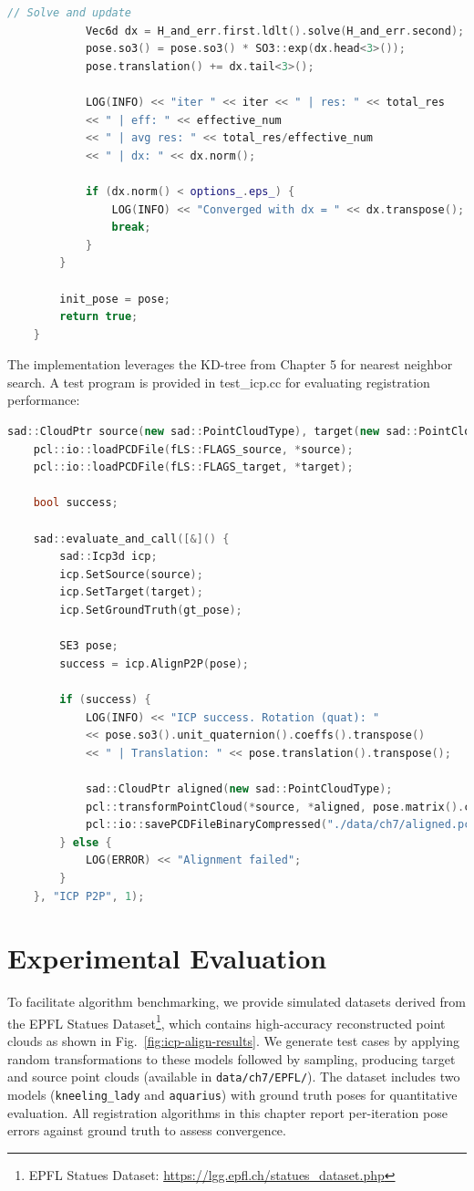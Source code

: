 \begin{lstlisting}[language=c++,caption=ch7/icp\_3d.cc]
			// Solve and update
			Vec6d dx = H_and_err.first.ldlt().solve(H_and_err.second);
			pose.so3() = pose.so3() * SO3::exp(dx.head<3>());
			pose.translation() += dx.tail<3>();
			
			LOG(INFO) << "iter " << iter << " | res: " << total_res 
			<< " | eff: " << effective_num
			<< " | avg res: " << total_res/effective_num
			<< " | dx: " << dx.norm();
			
			if (dx.norm() < options_.eps_) {
				LOG(INFO) << "Converged with dx = " << dx.transpose();
				break;
			}
		}
		
		init_pose = pose;
		return true;
	}
\end{lstlisting}

The implementation leverages the KD-tree from Chapter 5 for nearest neighbor search. A test program is provided in test\_icp.cc for evaluating registration performance:

\begin{lstlisting}[language=c++,caption=src/ch7/test/test_icp.cc]
	sad::CloudPtr source(new sad::PointCloudType), target(new sad::PointCloudType);
	pcl::io::loadPCDFile(fLS::FLAGS_source, *source);
	pcl::io::loadPCDFile(fLS::FLAGS_target, *target);
	
	bool success;
	
	sad::evaluate_and_call([&]() {
		sad::Icp3d icp;
		icp.SetSource(source);
		icp.SetTarget(target);
		icp.SetGroundTruth(gt_pose);
		
		SE3 pose;
		success = icp.AlignP2P(pose);
		
		if (success) {
			LOG(INFO) << "ICP success. Rotation (quat): " 
			<< pose.so3().unit_quaternion().coeffs().transpose()
			<< " | Translation: " << pose.translation().transpose();
			
			sad::CloudPtr aligned(new sad::PointCloudType);
			pcl::transformPointCloud(*source, *aligned, pose.matrix().cast<float>());
			pcl::io::savePCDFileBinaryCompressed("./data/ch7/aligned.pcd", *aligned);
		} else {
			LOG(ERROR) << "Alignment failed";
		}
	}, "ICP P2P", 1);
\end{lstlisting}

\section{Experimental Evaluation}
To facilitate algorithm benchmarking, we provide simulated datasets derived from the EPFL Statues Dataset\footnote{EPFL Statues Dataset: \url{https://lgg.epfl.ch/statues_dataset.php}}, which contains high-accuracy reconstructed point clouds as shown in Fig.~\ref{fig:icp-align-results}. We generate test cases by applying random transformations to these models followed by sampling, producing target and source point clouds (available in \texttt{data/ch7/EPFL/}). The dataset includes two models (\texttt{kneeling\_lady} and \texttt{aquarius}) with ground truth poses for quantitative evaluation. All registration algorithms in this chapter report per-iteration pose errors against ground truth to assess convergence.

